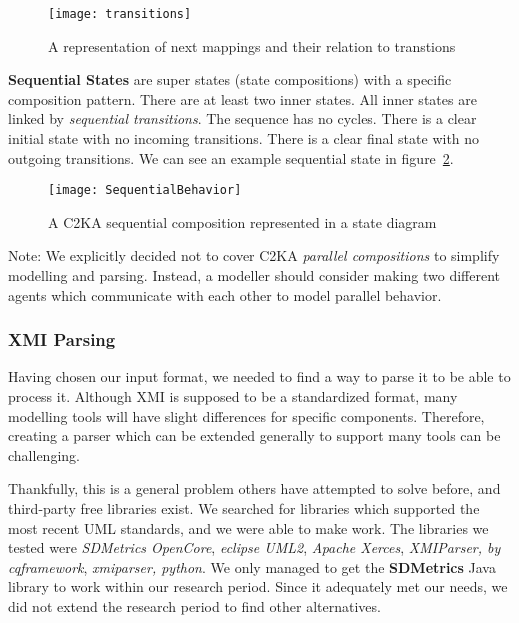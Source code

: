     \begin{figure}[h]
        \centering
        \texttt{[image: transitions]}
        \caption{A representation of next mappings and their relation to transtions}
        \label{fig:transition}
    \end{figure}

    \textbf{Sequential States} are super states (state compositions) with a specific composition pattern.
    There are at least two inner states.
    All inner states are linked by \textit{sequential transitions}.
    The sequence has no cycles.
    There is a clear initial state with no incoming transitions.
    There is a clear final state with no outgoing transitions.
    We can see an example sequential state in figure~\ref{fig:sequential}.

    \begin{figure}[h]
        \centering
        \texttt{[image: SequentialBehavior]}
        \caption{A C2KA sequential composition represented in a state diagram}
        \label{fig:sequential}
    \end{figure}

    Note: We explicitly decided not to cover C2KA \textit{parallel compositions} to simplify modelling and parsing.
    Instead, a modeller should consider making two different agents which communicate
    with each other to model parallel behavior.

    \subsubsection{XMI Parsing}\label{subsubsec:parsing}
    Having chosen our input format, we needed to find a way to parse it to be able to process it.
    Although XMI is supposed to be a standardized format,
    many modelling tools will have slight differences for specific components.
    Therefore, creating a parser which can be extended generally to support many tools can be challenging.

    Thankfully, this is a general problem others have attempted to solve before, and third-party free libraries exist.
    We searched for libraries which supported the most recent UML standards, and we were able to make work.
    The libraries we tested were \textit{SDMetrics OpenCore},
    \textit{eclipse UML2}, \textit{Apache Xerces}, \textit{XMIParser, by cqframework}, \textit{xmiparser, python}.
    We only managed to get the \textbf{SDMetrics} Java library to work within our research period.
    Since it adequately met our needs, we did not extend the research period to find other alternatives.

